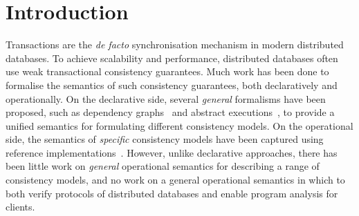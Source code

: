 \section{Introduction}
Transactions are the \emph{de facto} synchronisation mechanism in modern distributed databases.
To achieve scalability and performance, distributed databases  
often use weak transactional consistency guarantees. 
Much work has been done to formalise the semantics of such consistency guarantees, both
declaratively and operationally.
On the declarative side, several \emph{general} formalisms have been proposed, 
such as dependency graphs~\cite{adya} and abstract executions~\cite{framework-concur}, to provide a unified
semantics for formulating different consistency models.  
On the operational side, the semantics of \emph{specific} consistency models have
been captured using reference implementations~\cite{si,PSI,PSI-RA}. 
However, unlike declarative approaches, there has been
little work on \emph{general} operational semantics for describing a range
of consistency models, and no work on a general operational semantics
in which to both verify protocols of distributed databases and 
enable program analysis for clients.

